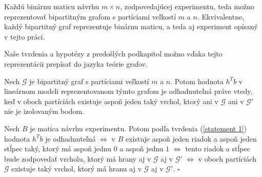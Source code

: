 \begin{center}


\end{center}

Každú binárnu maticu návrhu $m \times n$, zodpovedajúcej experimentu, teda možno reprezentovať bipartitným grafom s partíciami veľkostí $m$ a $n$. 
Ekvivalentne, každý bipartitný graf reprezentuje binárnu maticu, a teda aj experiment opísaný v tejto práci.

Naše tvrdenia a hypotézy z predošlých podkapitol možno vďaka tejto reprezentácii prepísať do jazyka teórie grafov.

\begin{prop}
Nech $\mathcal{G}$ je bipartitný graf s partíciami veľkostí $m$ a $n$. 
Potom hodnota $h^T b$ v lineárnom modeli reprezentovanom týmto grafom je odhadnuteľná práve vtedy,
keď v oboch partíciách existuje aspoň jeden taký vrchol, ktorý ani v $\mathcal{G}$ ani v $\mathcal{G}'$ nie je izolovaným bodom.
\end{prop}

\begin{dokaz}
Nech $B$ je matica návrhu experimentu. Potom podľa tvrdenia (\ref{statement 1})
hodnota $h^T b$ je odhadnuteľná $\Leftrightarrow$ v $B$ existuje aspoň jeden riadok a aspoň jeden stĺpec taký,
ktorý má aspoň jednu $0$ a aspoň jednu $1$ $\Leftrightarrow$ tento riadok a stĺpec bude zodpovedať vrcholu,
ktorý má hrany aj v $\mathcal{G}$ aj v $\mathcal{G}'$ $\Leftrightarrow$ v oboch partíciách $\mathcal{G}$ existuje taký vrchol, ktorý má hranu aj v $\mathcal{G}$ aj v $\mathcal{G}'$. $\square$
\end{dokaz}

